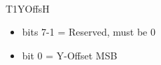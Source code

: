 \\
T1YOffsH
\begin{itemize}
\item bits 7-1 = Reserved, must be 0
\item bit 0 = Y-Offset MSB
\end{itemize}

